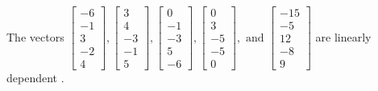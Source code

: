 \begin{exercise}
\begin{exerciseStatement}
  \end{exerciseStatement}
  \begin{exerciseAnswer}
   The vectors \(\left[\begin{array}{r}
-6 \\
-1 \\
3 \\
-2 \\
4
\end{array}\right] , \left[\begin{array}{r}
3 \\
4 \\
-3 \\
-1 \\
5
\end{array}\right] , \left[\begin{array}{r}
0 \\
-1 \\
-3 \\
5 \\
-6
\end{array}\right] , \left[\begin{array}{r}
0 \\
3 \\
-5 \\
-5 \\
0
\end{array}\right] , \text{ and } \left[\begin{array}{r}
-15 \\
-5 \\
12 \\
-8 \\
9
\end{array}\right]\) are 
  	 linearly dependent  .
  


  \end{exerciseAnswer}
\end{exercise}